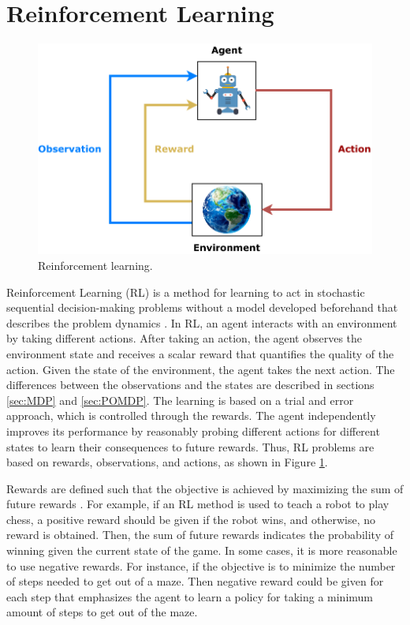 \documentclass[english, 12pt, a4paper, elec, utf8, a-1b, online]{aaltothesis}
\numberwithin{equation}{section}
\begin{document}
\newpage
\section{Reinforcement Learning} \label{sec:RL}

\begin{figure}[b]
    \centering
    \includegraphics{figures/RL_diagram.pdf}
    \caption{Reinforcement learning.}
    \label{fig:RL_basics}
\end{figure}

Reinforcement Learning (RL) is a method for learning to act in stochastic sequential decision-making problems without a model developed beforehand that describes the problem dynamics \cite{Sutton2018}.
In RL, an agent interacts with an environment by taking different actions.
After taking an action, the agent observes the environment state and receives a scalar reward that quantifies the quality of the action.
Given the state of the environment, the agent takes the next action. 
The differences between the observations and the states are described in sections \ref{sec:MDP} and \ref{sec:POMDP}.
The learning is based on a trial and error approach, which is controlled through the rewards.
The agent independently improves its performance by reasonably probing different actions for different states to learn their consequences to future rewards.
Thus, RL problems are based on rewards, observations, and actions, as shown in Figure \ref{fig:RL_basics}.

Rewards are defined such that the objective is achieved by maximizing the sum of future rewards \cite{Sutton2018}.
For example, if an RL method is used to teach a robot to play chess, a positive reward should be given if the robot wins, and otherwise, no reward is obtained.
Then, the sum of future rewards indicates the probability of winning given the current state of the game.
In some cases, it is more reasonable to use negative rewards.
For instance, if the objective is to minimize the number of steps needed to get out of a maze. 
Then negative reward could be given for each step that emphasizes the agent to learn a policy for taking a minimum amount of steps to get out of the maze.
\end{document}
